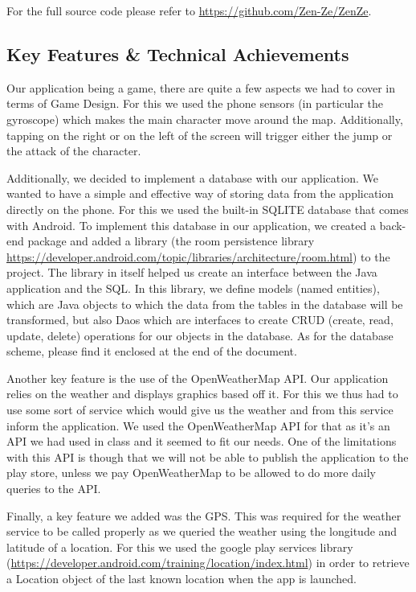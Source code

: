 \documentclass{sigchi}
\begin{document}
For the full source code please refer to \url{https://github.com/Zen-Ze/ZenZe}.

\subsection{Key Features \& Technical Achievements}
Our application being a game, there are quite a few aspects we had to cover in terms of Game Design. For this we used the phone sensors (in particular the gyroscope) which makes the main character move around the map. Additionally, tapping on the right or on the left of the screen will trigger either the jump or the attack of the character. 

Additionally, we decided to implement a database with our application. We wanted to have a simple and effective way of storing data from the application directly on the phone. For this we used the built-in SQLITE database that comes with Android. To implement this database in our application, we created a back-end package and added a library (the room persistence library \url{https://developer.android.com/topic/libraries/architecture/room.html}) to the project. The library in itself helped us create an interface between the Java application and the SQL. In this library, we define models (named entities), which are Java objects to which the data from the tables in the database will be transformed, but also Daos which are interfaces to create CRUD (create, read, update, delete) operations for our objects in the database. As for the database scheme, please find it enclosed at the end of the document.

Another key feature is the use of the OpenWeatherMap API. Our application relies on the weather and displays graphics based off it. For this we thus had to use some sort of service which would give us the weather and from this service inform the application. We used the OpenWeatherMap API for that as it's an API we had used in class and it seemed to fit our needs. One of the limitations with this API is though that we will not be able to publish the application to the play store, unless we pay OpenWeatherMap to be allowed to do more daily queries to the API. 

Finally, a key feature we added was the GPS. This was required for the weather service to be called properly as we queried the weather using the longitude and latitude of a location. For this we used the google play services library (\url{https://developer.android.com/training/location/index.html}) in order to retrieve a Location object of the last known location when the app is launched. 
\end{document}
